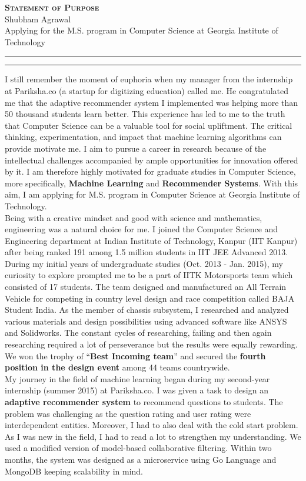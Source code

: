\documentclass[letterpaper]{article}
\newcommand{\univ}{Georgia Institute of Technology}
\newcommand{\soptitle}{Statement of Purpose}
\newcommand{\yourname}{Shubham Agrawal}
\begin{document}
\begin{center}
	{ \LARGE \scshape \textbf{\soptitle}\\ }	
	{ \Large \yourname\\}
	{ Applying for the M.S. program in Computer Science at \univ}
\end{center}

\hrule
\vspace{1pt}
\hrule
\bigskip
I still remember the moment of euphoria when my manager from the internship at Pariksha.co (a startup for digitizing education) called me. He congratulated me that the adaptive recommender system I implemented was helping more than 50 thousand students learn better. This experience has led to me to the truth that Computer Science can be a valuable tool for social upliftment. The critical thinking, experimentation, and impact that machine learning algorithms can provide motivate me. I aim to pursue a career in research because of the intellectual challenges accompanied by ample opportunities for innovation offered by it. I am therefore highly motivated for graduate studies in Computer Science, more specifically, \textbf{Machine Learning} and \textbf{Recommender Systems}. With this aim, I am applying for M.S. program in Computer Science at \univ. \\

Being with a creative mindset and good with science and mathematics, engineering was a natural choice for me. I joined the Computer Science and Engineering department at Indian Institute of Technology, Kanpur (IIT Kanpur) after being ranked 191 among 1.5 million students in IIT JEE Advanced 2013. During my initial years of undergraduate studies (Oct. 2013 - Jan. 2015), my curiosity to explore prompted me to be a part of IITK Motorsports team which consisted of 17 students. The team designed and manufactured an All Terrain Vehicle for competing in country level design and race competition called BAJA Student India. As the member of chassis subsystem, I researched and analyzed various materials and design possibilities using advanced software like ANSYS and Solidworks. The constant cycles of researching, failing and then again researching required a lot of perseverance but the results were equally rewarding. We won the trophy of “\textbf{Best Incoming team}” and secured the \textbf{fourth position in the design event} among 44 teams countrywide. \\

My journey in the field of machine learning began during my second-year internship (summer 2015) at Pariksha.co. I was given a task to design an \textbf{adaptive recommender system} to recommend questions to students. The problem was challenging as the question rating and user rating were interdependent entities. Moreover, I had to also deal with the cold start problem. As I was new in the field, I had to read a lot to strengthen my understanding. We used a modified version of model-based collaborative filtering. Within two months, the system was designed as a microservice using Go Language and MongoDB keeping scalability in mind. \\
\end{document}

